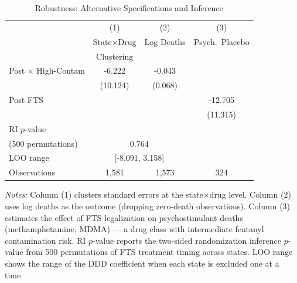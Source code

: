 \begin{table}[H]
\centering
\caption{Robustness: Alternative Specifications and Inference}
\label{tab:robust}
\begin{threeparttable}
\begin{tabular}{lccc}
\toprule
 & (1) & (2) & (3) \\
 & State$\times$Drug & Log Deaths & Psych.\ Placebo \\
 & Clustering & & \\
\midrule
Post $\times$ High-Contam & -6.222 & -0.043 & \\
 & (10.124) & (0.068) & \\
Post FTS & & & -12.705 \\
 & & & (11.315) \\
\midrule
RI $p$-value & & & \\
\quad (500 permutations) & \multicolumn{2}{c}{0.764} & \\
LOO range & \multicolumn{2}{c}{[-8.091, 3.158]} & \\
\midrule
Observations & 1,581 & 1,573 & 324 \\
\bottomrule
\end{tabular}
\begin{tablenotes}[flushleft]
\small
\item \textit{Notes:} Column (1) clusters standard errors at the state$\times$drug level. Column (2) uses log deaths as the outcome (dropping zero-death observations). Column (3) estimates the effect of FTS legalization on psychostimulant deaths (methamphetamine, MDMA) --- a drug class with intermediate fentanyl contamination risk. RI $p$-value reports the two-sided randomization inference $p$-value from 500 permutations of FTS treatment timing across states. LOO range shows the range of the DDD coefficient when each state is excluded one at a time.
\end{tablenotes}
\end{threeparttable}
\end{table}

